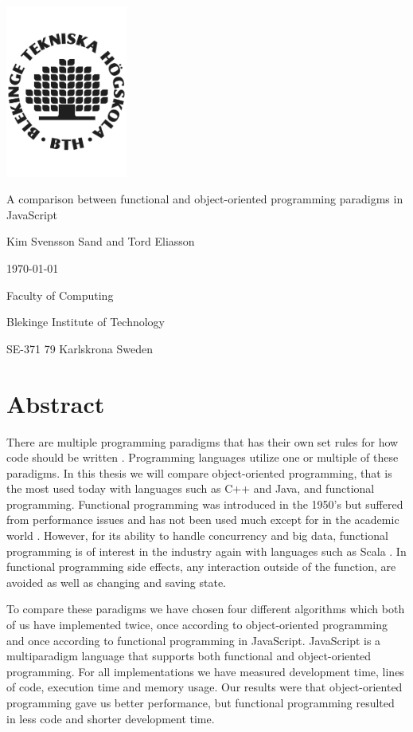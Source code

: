\documentclass {article}
\begin{document}
\begin{titlepage}
	\centering
	\includegraphics[width=0.3\textwidth]{bth-logo} \par
	{\LARGE A comparison between functional and object-oriented programming paradigms in JavaScript \par}
	\vspace{1cm}
{\large Kim Svensson Sand and Tord Eliasson \par}
{\large \today \par}
	\vfill

	{\normalsize Faculty of Computing \par}
	{\normalsize Blekinge Institute of Technology \par}
	{\normalsize SE-371 79 Karlskrona Sweden \par}
\end{titlepage}
\newpage
\section*{Abstract}
There are multiple programming paradigms that has their own set rules for how code should be written \cite{programming-paradigms}. Programming languages utilize one or multiple of these paradigms. In this thesis we will compare object-oriented programming, that is the most used today with languages such as C++ and Java, and functional programming. Functional programming was introduced in the 1950's but suffered from performance issues and has not been used much except for in the academic world \cite{gabmar}. However, for its ability to handle concurrency and big data, functional programming is of interest in the industry again with languages such as Scala \cite{meijer, eriksen}. In functional programming side effects, any interaction outside of the function, are avoided as well as changing and saving state. 

To compare these paradigms we have chosen four different algorithms which both of us have implemented twice, once according to object-oriented programming and once according to functional programming in JavaScript. JavaScript is a multiparadigm language that supports both functional and object-oriented programming. For all implementations we have measured development time, lines of code, execution time and memory usage. Our results were that object-oriented programming gave us better performance, but functional programming resulted in less code and shorter development time. 
\end{document}
